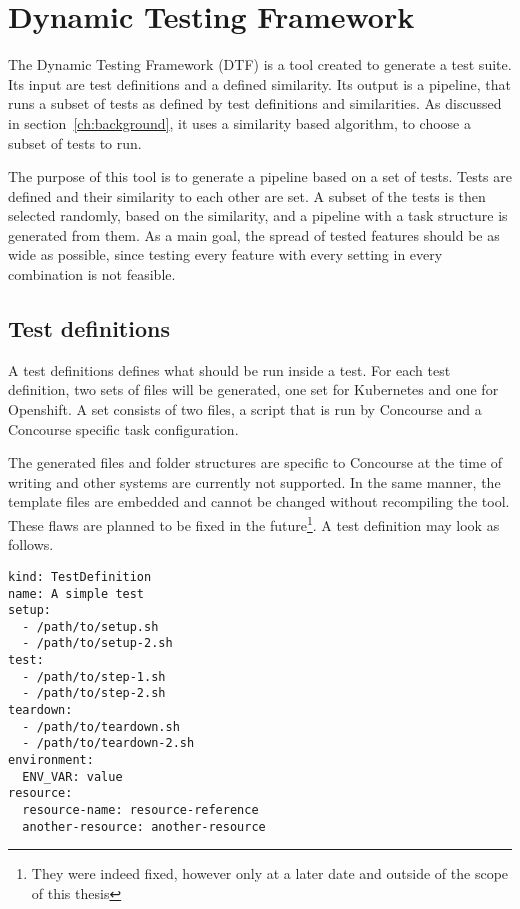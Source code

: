 \section{Dynamic Testing Framework}\label{sec:dynamic-testing-framework}

The Dynamic Testing Framework (DTF) is a tool created to generate a test suite.
Its input are test definitions and a defined similarity.
Its output is a pipeline, that runs a subset of tests as defined by test definitions and similarities.
As discussed in section~\ref{ch:background}, it uses a similarity based algorithm, to choose a subset of tests to run.

The purpose of this tool is to generate a pipeline based on a set of tests.
Tests are defined and their similarity to each other are set.
A subset of the tests is then selected randomly, based on the similarity, and a pipeline with a task structure is generated from them.
As a main goal, the spread of tested features should be as wide as possible, since testing every feature with every setting in every combination is not feasible.

\subsection{Test definitions}\label{subsec:test-definitions}

A test definitions defines what should be run inside a test.
For each test definition, two sets of files will be generated, one set for Kubernetes and one for Openshift.
A set consists of two files, a script that is run by Concourse and a Concourse specific task configuration.

The generated files and folder structures are specific to Concourse at the time of writing and other systems are currently not supported.
In the same manner, the template files are embedded and cannot be changed without recompiling the tool.
These flaws are planned to be fixed in the future\footnote{They were indeed fixed, however only at a later date and outside of the scope of this thesis}.
A test definition may look as follows.

\begin{verbatim}
kind: TestDefinition
name: A simple test
setup:
  - /path/to/setup.sh
  - /path/to/setup-2.sh
test:
  - /path/to/step-1.sh
  - /path/to/step-2.sh
teardown:
  - /path/to/teardown.sh
  - /path/to/teardown-2.sh
environment:
  ENV_VAR: value
resource:
  resource-name: resource-reference
  another-resource: another-resource
\end{verbatim}

